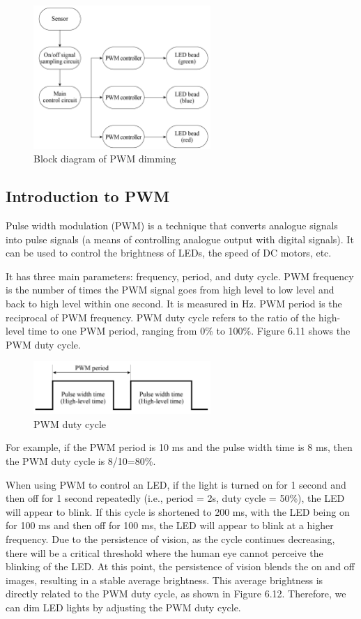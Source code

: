 \documentclass[a4paper,12pt,openany]{book}
\begin{document}
\begin{figure}[h!]
    \centering
    \includegraphics[width=0.6\textwidth]{D6Z/6-10}
    \caption{Block diagram of PWM dimming}
\end{figure}

\subsection{Introduction to PWM}
Pulse width modulation (PWM) is a technique that converts analogue signals into pulse signals (a means of controlling analogue output with digital signals). It can be used to control the brightness of LEDs, the speed of DC motors, etc.

It has three main parameters: frequency, period, and duty cycle. PWM frequency is the number of times the PWM signal goes from high level to low level and back to high level within one second. It is measured in Hz. PWM period is the reciprocal of PWM frequency. PWM duty cycle refers to the ratio of the high-level time to one PWM period, ranging from 0\% to 100\%. Figure 6.11 shows the PWM duty cycle.

\begin{figure}[h!]
    \centering
    \includegraphics[width=0.6\textwidth]{D6Z/6-11}
    \caption{PWM duty cycle}
\end{figure}

For example, if the PWM period is 10 ms and the pulse width time is 8 ms, then the PWM duty cycle is 8/10=80\%.
    
When using PWM to control an LED, if the light is turned on for 1 second and then off for 1 second repeatedly (i.e., period = 2s, duty cycle = 50\%), the LED will appear to blink. If this cycle is shortened to 200 ms, with the LED being on for 100 ms and then off for 100 ms, the LED will appear to blink at a higher frequency. Due to the persistence of vision, as the cycle continues decreasing, there will be a critical threshold where the human eye cannot perceive the blinking of the LED. At this point, the persistence of vision blends the on and off images, resulting in a stable average brightness. This average brightness is directly related to the PWM duty cycle, as shown in Figure 6.12. Therefore, we can dim LED lights by adjusting the PWM duty cycle.
\end{document}
